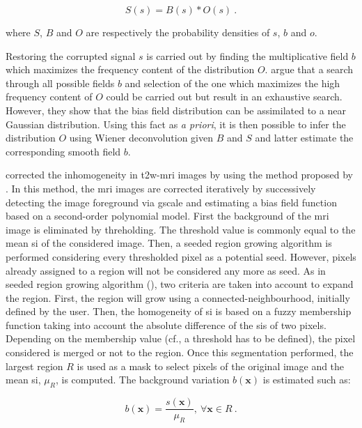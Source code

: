 \begin{enumerate}[leftmargin=*]
\begin{equation}
	S(s) = B(s) * O(s) \ .
	\label{eq:distrbias} 
\end{equation}

\noindent where $S$, $B$ and $O$ are respectively the probability densities of $s$, $b$ and $o$.

Restoring the corrupted signal $s$ is carried out by finding the multiplicative field $b$ which maximizes the frequency content of the distribution $O$. \cite{Sled1998} argue that a search through all possible fields $b$ and selection of the one which maximizes the high frequency content of $O$ could be carried out but result in an exhaustive search. However, they show that the bias field distribution can be assimilated to a near Gaussian distribution. Using this fact as \textit{a priori}, it is then possible to infer the distribution $O$ using Wiener deconvolution given $B$ and $S$ and latter estimate the corresponding smooth field $b$.

\cite{Lv2009} corrected the inhomogeneity in \ac{t2w}-\ac{mri} images by using the method proposed by \cite{Madabhushi2006}. In this method, the \ac{mri} images are corrected iteratively by successively detecting the image foreground via \ac{gscale} and estimating a bias field function based on a second-order polynomial model. First the background of the \ac{mri} image is eliminated by threholding. The threshold value is commonly equal to the mean \ac{si} of the considered image. Then, a seeded region growing algorithm is performed considering every thresholded pixel as a potential seed. However, pixels already assigned to a region will not be considered any more as seed. As in seeded region growing algorithm (\cite{Shapiro2001}), two criteria are taken into account to expand the region. First, the region will grow using a connected-neighbourhood, initially defined by the user. Then, the homogeneity of \ac{si} is based on a fuzzy membership function taking into account the absolute difference of the \acp{si} of two pixels. Depending on the membership value (cf., a threshold has to be defined), the pixel considered is merged or not to the region. Once this segmentation performed, the largest region $R$ is used as a mask to select pixels of the original image and the mean \ac{si}, $\mu_{R}$, is computed. The background variation $b(\mathbf{x})$ is estimated such as:

\begin{equation}
	b(\mathbf{x}) = \frac{s(\mathbf{x})}{\mu_{R}}, \ \forall \mathbf{x} \in R \ .
	\label{eq:backest}
\end{equation}


\end{enumerate}
